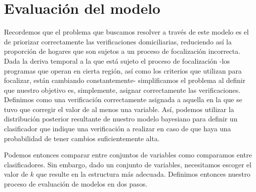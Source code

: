 \chapter{Evaluación del modelo}
\label{chap:evaluacion}
Recordemos que el problema que buscamos resolver a través de este modelo es el de priorizar correctamente las verificaciones domiciliarias, reduciendo así la proporción de hogares que son sujetos a un proceso de focalización incorrecta. Dada la deriva temporal a la que está sujeto el proceso de focalización -los programas que operan en cierta región, así como los criterios que utilizan para focalizar, están cambiando constantemente- simplificamos el problema al definir que nuestro objetivo es, simplemente, asignar correctamente las verificaciones. Definimos como una verificación correctamente asignada a aquella en la que se tuvo que corregir el valor de al menos una variable. Así, podemos utilizar la distribución posterior resultante de nuestro modelo bayesiano para definir un clasificador que indique una verificación a realizar en caso de que haya una probabilidad de tener cambios suficientemente alta.
\par
\noindent
Podemos entonces comparar entre conjuntos de variables como comparamos entre clasificadores. Sin embargo, dado un conjunto de variables, necesitamos escoger el valor de $k$ que resulte en la estructura más adecuada. Definimos entonces nuestro proceso de evaluación de modelos en dos pasos.

